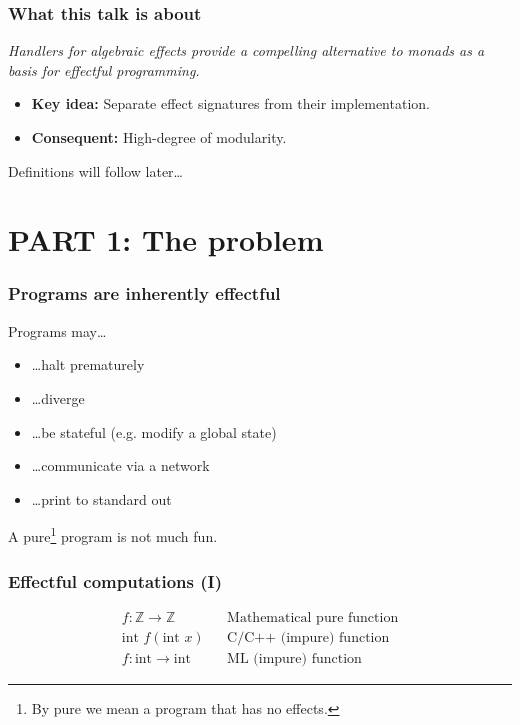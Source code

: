 \begin{frame}
  \frametitle{What this talk is about}
  \begin{center}
    \emph{Handlers for \alert<1->{algebraic effects} provide a compelling alternative to \alert<1->{monads} as a basis for \alert<1->{effectful programming}.}
  \end{center}
\begin{itemize}
  \item \textbf{Key idea:} Separate effect signatures from their implementation.
  \item \textbf{Consequent:} High-degree of modularity.
\end{itemize}
{\footnotesize{Definitions will follow later\dots}}
\end{frame}

\section{PART 1: The problem}

\begin{frame}
  \frametitle{Programs are inherently effectful}
  Programs may\dots
  \begin{itemize}
    \item \dots halt prematurely
    \item \dots diverge
    \item \dots be stateful (e.g. modify a global state)
    \item \dots communicate via a network
    \item \dots print to standard out
  \end{itemize}
  A pure\footnote{By pure we mean a program that has no effects.} program is not much fun.
\end{frame}


\begin{frame}
  \frametitle{Effectful computations (I)}
  \begin{align*}
    f : \mathbb{Z} \to \mathbb{Z} && \text{Mathematical pure function}\\
    \text{int } f(\text{int } x)   && \text{C/C++ (impure) function}\\
    f : \text{int} \to \text{int} && \text{ML (impure) function}
  \end{align*}
\end{frame}

